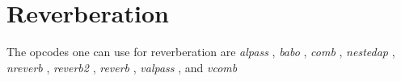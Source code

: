 \begin{comment}
\documentclass[10pt]{article}
\usepackage{fullpage, graphicx, url}
\setlength{\parskip}{1ex}
\setlength{\parindent}{0ex}
\title{Reverberation}



\begin{tabular}{ccc}
The Alternative Csound Reference Manual & & \\
Previous &Signal Modifiers &Next

\end{tabular}

\end{comment}
\section{Reverberation}


  The opcodes one can use for reverberation are \emph{alpass}
, \emph{babo}
, \emph{comb}
, \emph{nestedap}
, \emph{nreverb}
, \emph{reverb2}
, \emph{reverb}
, \emph{valpass}
, and \emph{vcomb}



\begin{comment}
\begin{tabular}{lcr}
Previous &Home &Next \\
Panning and Spatialization &Up &Sample Level Operators

\end{tabular}



\end{comment}
